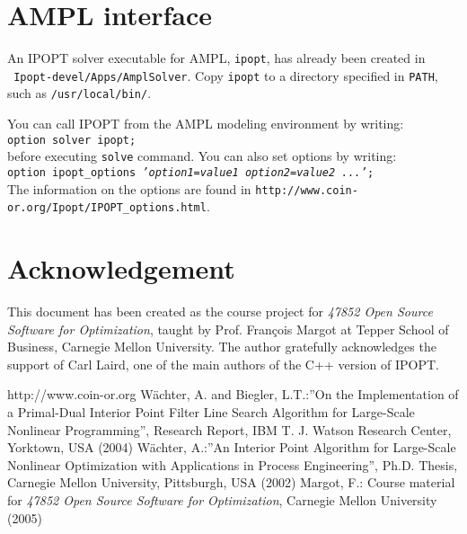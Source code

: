 \documentclass[letter,12pt]{article}
\begin{document}
\section{AMPL interface}
An IPOPT solver executable for AMPL, {\tt ipopt}, has already been 
created in\\{\tt
Ipopt-devel/Apps/AmplSolver}. Copy {\tt ipopt} to a directory
specified in {\tt PATH}, such as {\tt /usr/local/bin/}.\par
You can call IPOPT from the AMPL modeling environment by writing:\\
{\tt option solver ipopt;}\\
before executing {\tt solve} command. You can also set options by
writing:\\
{\tt option ipopt\_options \textit{'option1=value1 option2=value2 ...'};}\\
The information on the options are found in {\tt http://www.coin-or.org/Ipopt/IPOPT\_options.html}.


\section*{Acknowledgement}
This document has been created as the course project for \textit{47852 Open
Source Software for Optimization}, taught by Prof. Fran\c cois Margot at 
Tepper School of Business, Carnegie Mellon University. The author
gratefully acknowledges the support of Carl Laird, one of the 
main authors of the C++ version of IPOPT.

\begin{thebibliography}{99}
http://www.coin-or.org
W\"achter, A. and Biegler, L.T.:''On the Implementation of a Primal-Dual
	Interior Point Filter Line Search Algorithm for Large-Scale
	Nonlinear Programming'', Research Report, IBM T. J. Watson
	Research Center, Yorktown, USA (2004)
W\"achter, A.:''An Interior Point Algorithm for Large-Scale Nonlinear
	Optimization with Applications in Process Engineering'',
	Ph.D. Thesis, Carnegie Mellon University, Pittsburgh, USA (2002)
Margot, F.: Course material for \textit{47852 Open Source Software for
	Optimization}, Carnegie Mellon University (2005)
\end{thebibliography}
\end{document}
